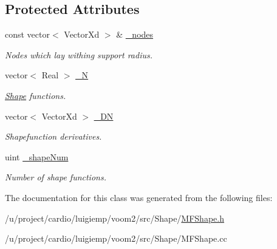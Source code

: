 \subsection*{Protected Attributes}
\begin{DoxyCompactItemize}
\item 
\hypertarget{classvoom_1_1_m_f_shape_a4619a9546595c6b145cf392af4c3db84}{
const vector$<$ VectorXd $>$ \& \hyperlink{classvoom_1_1_m_f_shape_a4619a9546595c6b145cf392af4c3db84}{\_\-nodes}}
\label{classvoom_1_1_m_f_shape_a4619a9546595c6b145cf392af4c3db84}

\begin{DoxyCompactList}\small\item\em Nodes which lay withing support radius. \item\end{DoxyCompactList}\item 
\hypertarget{classvoom_1_1_m_f_shape_a01e0c0a865df4a28dba1cb6090b378d1}{
vector$<$ Real $>$ \hyperlink{classvoom_1_1_m_f_shape_a01e0c0a865df4a28dba1cb6090b378d1}{\_\-N}}
\label{classvoom_1_1_m_f_shape_a01e0c0a865df4a28dba1cb6090b378d1}

\begin{DoxyCompactList}\small\item\em \hyperlink{classvoom_1_1_shape}{Shape} functions. \item\end{DoxyCompactList}\item 
\hypertarget{classvoom_1_1_m_f_shape_a32c93d0524d948aea780f47f04e52031}{
vector$<$ VectorXd $>$ \hyperlink{classvoom_1_1_m_f_shape_a32c93d0524d948aea780f47f04e52031}{\_\-DN}}
\label{classvoom_1_1_m_f_shape_a32c93d0524d948aea780f47f04e52031}

\begin{DoxyCompactList}\small\item\em Shapefunction derivatives. \item\end{DoxyCompactList}\item 
\hypertarget{classvoom_1_1_m_f_shape_a1ac2531795f772861be14e5c63365ab5}{
uint \hyperlink{classvoom_1_1_m_f_shape_a1ac2531795f772861be14e5c63365ab5}{\_\-shapeNum}}
\label{classvoom_1_1_m_f_shape_a1ac2531795f772861be14e5c63365ab5}

\begin{DoxyCompactList}\small\item\em Number of shape functions. \item\end{DoxyCompactList}\end{DoxyCompactItemize}


The documentation for this class was generated from the following files:\begin{DoxyCompactItemize}
\item 
/u/project/cardio/luigiemp/voom2/src/Shape/\hyperlink{_m_f_shape_8h}{MFShape.h}\item 
/u/project/cardio/luigiemp/voom2/src/Shape/MFShape.cc\end{DoxyCompactItemize}
